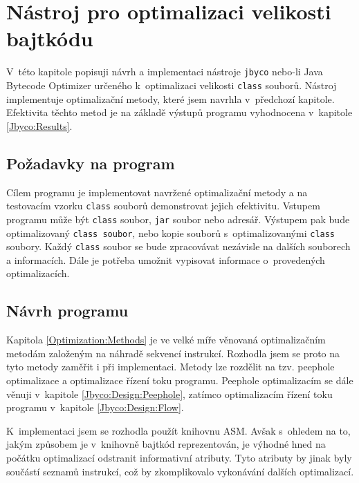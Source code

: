 \chapter{Nástroj pro optimalizaci velikosti bajtkódu}\label{Jbyco}

V~této kapitole popisuji návrh a implementaci nástroje \texttt{jbyco} nebo-li Java Bytecode Optimizer určeného k~optimalizaci velikosti \texttt{class} souborů. Nástroj implementuje optimalizační metody, které jsem navrhla v~předchozí kapitole. Efektivita těchto metod je na základě výstupů programu vyhodnocena v~kapitole \ref{Jbyco:Results}.

\section{Požadavky na program}\label{Jbyco:Requirements}

Cílem programu je implementovat navržené optimalizační metody a na testovacím vzorku \texttt{class} souborů demonstrovat jejich efektivitu. %
Vstupem programu může být \texttt{class} soubor, \texttt{jar} soubor nebo adresář. Výstupem pak bude optimalizovaný \texttt{class soubor}, nebo kopie souborů s~optimalizovanými \texttt{class} soubory. Každý \texttt{class} soubor se bude zpracovávat nezávisle na dalších souborech a informacích. Dále je potřeba umožnit vypisovat informace o~provedených optimalizacích.

\section{Návrh programu}\label{Jbyco:Design}

Kapitola \ref{Optimization:Methods} je ve velké míře věnovaná optimalizačním metodám založeným na náhradě sekvencí instrukcí. Rozhodla jsem se proto na tyto metody zaměřit i při implementaci. Metody lze rozdělit na tzv. peephole optimalizace a optimalizace řízení toku programu. Peephole optimalizacím se dále věnuji v~kapitole \ref{Jbyco:Design:Peephole}, zatímco optimalizacím řízení toku programu v~kapitole \ref{Jbyco:Design:Flow}. 

K~implementaci jsem se rozhodla použít knihovnu ASM. Avšak s~ohledem na to, jakým způsobem je v~knihovně bajtkód reprezentován, je výhodné hned na počátku optimalizací odstranit informativní atributy. Tyto atributy by jinak byly součástí seznamů instrukcí, což by zkomplikovalo vykonávání dalších optimalizací. 

